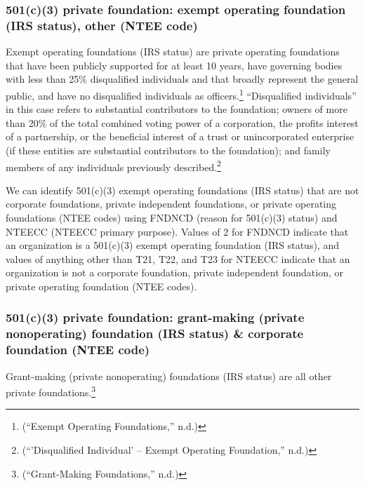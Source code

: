 \documentclass[
  letterpaper,
  DIV=11,
  numbers=noendperiod]{scrreprt}
\begin{document}
\hypertarget{c3-private-foundation-exempt-operating-foundation-irs-status-other-ntee-code}{%
\subsubsection{501(c)(3) private foundation: exempt operating foundation
(IRS status), other (NTEE
code)}\label{c3-private-foundation-exempt-operating-foundation-irs-status-other-ntee-code}}

Exempt operating foundations (IRS status) are private operating
foundations that have been publicly supported for at least 10 years,
have governing bodies with less than 25\% disqualified individuals and
that broadly represent the general public, and have no disqualified
individuals as officers.\footnote{({``Exempt Operating Foundations,''}
  n.d.)} ``Disqualified individuals'' in this case refers to substantial
contributors to the foundation; owners of more than 20\% of the total
combined voting power of a corporation, the profits interest of a
partnership, or the beneficial interest of a trust or unincorporated
enterprise (if these entities are substantial contributors to the
foundation); and family members of any individuals previously
described.\footnote{({``'Disqualified Individual' -- Exempt Operating
  Foundation,''} n.d.)}

We can identify 501(c)(3) exempt operating foundations (IRS status) that
are not corporate foundations, private independent foundations, or
private operating foundations (NTEE codes) using FNDNCD (reason for
501(c)(3) status) and NTEECC (NTEECC primary purpose). Values of 2 for
FNDNCD indicate that an organization is a 501(c)(3) exempt operating
foundation (IRS status), and values of anything other than T21, T22, and
T23 for NTEECC indicate that an organization is not a corporate
foundation, private independent foundation, or private operating
foundation (NTEE codes).

\hypertarget{c3-private-foundation-grant-making-private-nonoperating-foundation-irs-status-corporate-foundation-ntee-code}{%
\subsubsection{501(c)(3) private foundation: grant-making (private
nonoperating) foundation (IRS status) \& corporate foundation (NTEE
code)}\label{c3-private-foundation-grant-making-private-nonoperating-foundation-irs-status-corporate-foundation-ntee-code}}

Grant-making (private nonoperating) foundations (IRS status) are all
other private foundations.\footnote{({``Grant-Making Foundations,''}
  n.d.)}
\end{document}
